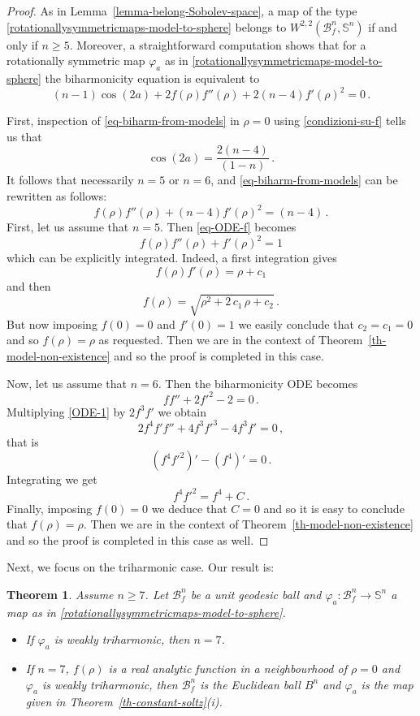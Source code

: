 \documentclass[11pt]{amsart}
\theoremstyle{plain}
\newtheorem{theorem}                {Theorem}      [section]
\theoremstyle{definition}
\numberwithin{equation}{section}
\def \s{{\mathbb S}}
\numberwithin{equation}{section}
\begin{document}
\begin{proof} 
As in Lemma~\ref{lemma-belong-Sobolev-space}, a map of the type \eqref{rotationallysymmetricmaps-model-to-sphere} belongs to $W^{2,2}\left (\mathcal{B}^n_f , \s^n \right ) $ if and only if $n \geq 5$. Moreover, a straightforward computation shows that for a rotationally symmetric map $\varphi_a$ as in \eqref{rotationallysymmetricmaps-model-to-sphere} the biharmonicity equation is equivalent to
\begin{equation}\label{eq-biharm-from-models}
(n-1) \cos (2 a)+2 f(\rho ) f''(\rho )+2 (n-4) f'(\rho )^2=0\,.
\end{equation}

First, inspection of \eqref{eq-biharm-from-models} in $\rho=0$ using \eqref{condizioni-su-f} tells us that
\[
\cos (2a)= \frac{2(n-4)}{(1-n)} \,.
\]
It follows that necessarily $n=5$ or $n=6$, and \eqref{eq-biharm-from-models} can be rewritten as follows:
\begin{equation}\label{eq-ODE-f}
f(\rho ) f''(\rho )+ (n-4) f'(\rho )^2=(n-4)\,.
\end{equation}
First, let us assume that $n=5$. Then \eqref{eq-ODE-f} becomes
\[
f(\rho ) f''(\rho )+  f'(\rho )^2=1
\]
which can be explicitly integrated. Indeed, a first integration gives
\[
f(\rho)f' (\rho)= \rho +c_1
\]
and then
\[
f(\rho)=\sqrt{\rho^2 + 2\,c_1\,\rho + c_2} \,.
\]
But now imposing $f(0)=0$ and $f'(0)=1$ we easily conclude that $c_2=c_1=0$ and so $f(\rho)=\rho$ as requested. Then we are in the context of Theorem~\ref{th-model-non-existence} and so the proof is completed in this case. 
\vspace{2mm}

Now, let us assume that $n = 6$. Then the biharmonicity ODE becomes
\begin{equation}\label{ODE-1}
f f'' + 2 f'^2 - 2 = 0 \,.
\end{equation}
Multiplying \eqref{ODE-1} by $2 f^3 f'$ we obtain
\[
2 f^4 f' f'' + 4 f^3 f'^3 - 4 f^3 f' = 0\,,
\]
that is
\[
(f^4 f'^2)'-(f^4)'=0\,.
\]
Integrating we get
\[
f^4 f'^2=f^4 +C\,.
\]
Finally, imposing $f(0)=0$ we deduce that $C=0$ and so it is easy to conclude that $f(\rho)=\rho$. Then we are in the context of Theorem~\ref{th-model-non-existence} and so the proof is completed in this case as well.
\end{proof}
\vspace{3mm}
Next, we focus on the triharmonic case. Our result is:
\begin{theorem}\label{th-model-non-existence-tri}
Assume $n \geq 7$. Let $\mathcal{B}^n_f$ be a unit geodesic ball and $\varphi_a:\mathcal{B}^n_f \to \s^n$ a map as in \eqref{rotationallysymmetricmaps-model-to-sphere}.
\begin{itemize}
\item[(i)] If $\varphi_a$ is weakly triharmonic, then $n=7$.
\item[(ii)] If $n=7$, $f(\rho)$ is a real analytic function in a neighbourhood of $\rho=0$ and $\varphi_a$ is weakly triharmonic, then $\mathcal{B}^n_f$ is the Euclidean ball $B^n$ and $\varphi_a$ is the map given in Theorem~\ref{th-constant-soltz}(i).
\end{itemize}
\end{theorem}
\end{document}

